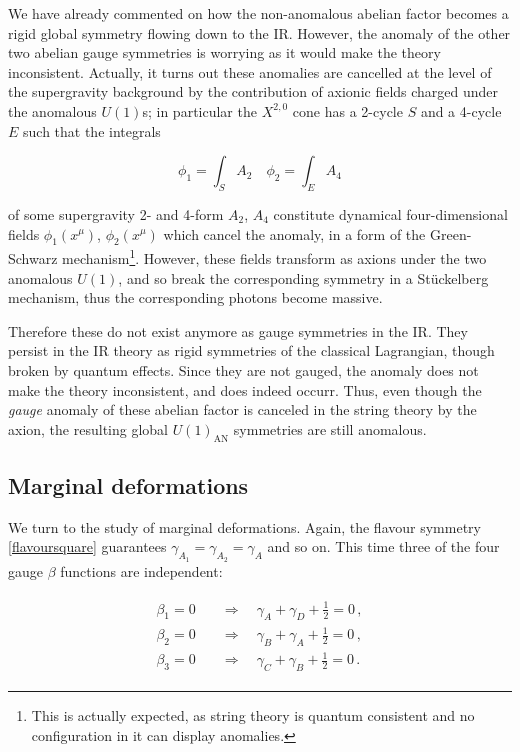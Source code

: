 We have already commented on how the non-anomalous abelian factor becomes a rigid global symmetry flowing down to the IR. However, the anomaly of the other two abelian gauge symmetries is worrying as it would make the theory inconsistent. Actually, it turns out these anomalies are cancelled at the level of the supergravity background by the contribution of axionic fields charged under the anomalous $U(1)$s; in particular the $X^{2,0}$ cone has a 2-cycle $S$ and a 4-cycle $E$ such that the integrals

\begin{equation}
	\phi_1 = \int_S A_2 \quad \phi_2 = \int_E A_4
	\label{}
\end{equation}

of some supergravity 2- and 4-form $A_2$, $A_4$ constitute dynamical four-dimensional fields $\phi_1(x^\mu)$, $\phi_2(x^\mu)$ which cancel the anomaly, in a form of the Green-Schwarz mechanism\footnote{This is actually expected, as string theory is quantum consistent and no configuration in it can display anomalies.}. However, these fields transform as axions under the two anomalous $U(1)$, and so break the corresponding symmetry in a St\"uckelberg mechanism, thus the corresponding photons become massive.

Therefore these do not exist anymore as gauge symmetries in the IR. They persist in the IR theory as rigid symmetries of the classical Lagrangian, though broken by quantum effects. Since they are not gauged, the anomaly does not make the theory inconsistent, and does indeed occurr. Thus, even though the \emph{gauge} anomaly of these abelian factor is canceled in the string theory by the axion, the resulting global $U(1)_\text{AN}$ symmetries are still anomalous.

\subsection{Marginal deformations} \label{sec:squaresmarginal}

We turn to the study of marginal deformations. Again, the flavour symmetry \eqref{flavoursquare} guarantees $\gamma_{A_1} = \gamma_{A_2} = \gamma_A$ and so on. This time three of the four gauge $\beta$ functions are independent:

\begin{align}
	\begin{split}
\beta_1 = 0 \quad	& \Rightarrow  \quad	\gamma_A + \gamma_D + \frac{1}{2} = 0\,, \\
\beta_2 = 0 \quad	&  \Rightarrow	\quad	\gamma_B + \gamma_A + \frac{1}{2} = 0\,, \\
\beta_3 = 0 \quad	&  \Rightarrow	\quad	\gamma_C + \gamma_B + \frac{1}{2} = 0\,.
	\end{split}
\end{align}

